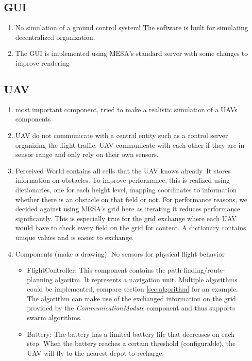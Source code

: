 \subsection{GUI}
\begin{enumerate}

	\item No simulation of a ground control system! The software is built for simulating decentralized organization.
	\item The GUI is implemented using MESA's standard server with some changes to improve rendering
\end{enumerate}

\subsection{UAV}
\begin{enumerate}
	\item most important component, tried to make a realistic simulation of a UAVs components
	\item UAV do not communicate with a central entity such as a control server organizing the flight traffic. UAV communicate with each other if they are in sensor range and only rely on their own sensors.
	\item Perceived World contains all cells that the UAV knows already. It stores information on obstacles. To improve performance, this is realized using dictionaries, one for each height level, mapping coordinates to information whether there is an obstacle on that field or not. For performance reasons, we decided against using MESA's grid here as iterating it reduces performance significantly. This is especially true for the grid exchange where each UAV  would have to check every field on the grid for content.  A dictionary contains unique values and is easier to exchange.
	\item Components (make a drawing). No sensors for physical flight behavior
	\begin{itemize}
		\item FlightController: This component contains the path-finding/route-planning algoritm. It represents a navigation unit. Multiple algorithms could be implemented, compare section \ref{sec:algorithm} for an example. The algorithm can make use of the exchanged information on the grid provided by the \textit{CommunicationModule} component and thus supports swarm algorithms.
		\item Battery: The battery has a limited battery life that decreases on each step. When the battery reaches a certain threshold (configurable), the UAV will fly to the nearest depot to recharge.

\end{itemize}
\end{enumerate}
